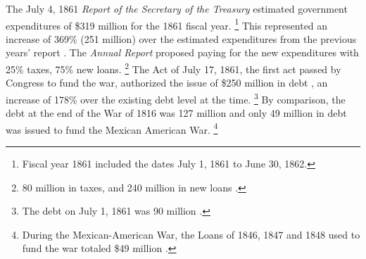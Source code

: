 The July 4, 1861 \textit{Report of the Secretary of the Treasury} estimated government expenditures of \$319 million for the 1861 fiscal year\parencite[5]{Treasury1861a}.%
\footnote{Fiscal year 1861 included the dates July 1, 1861 to June 30, 1862.} 
This represented an increase of 369\% (251 million) over the estimated expenditures from the previous years' report \parencite[6]{Treasury1860}.
The \textit{Annual Report} proposed paying for the new expenditures with 25\% taxes, 75\% new loans.%
\footnote{80 million in taxes, and 240 million in new loans \parencite[6]{Treasury1861a}.}
The Act of July 17, 1861, the first act passed by Congress to fund the war, authorized the issue of \$250 million in debt \parencite[44]{Treasury1863}, an increase of 178\% over the existing debt level at the time.%
\footnote{The debt on July 1, 1861 was 90 million \parencite[23]{Treasury1861a}.}
By comparison, the debt at the end of the War of 1816 was 127 million \parencite[29]{Elder1863} and only 49 million in debt was issued to fund the Mexican American War.%
\footnote{During the Mexican-American War, the Loans of 1846, 1847 and 1848 used to fund the war totaled \$49 million \parencite[42]{Treasury1863}.}

